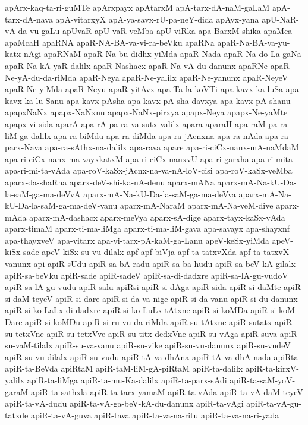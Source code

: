 {apArx-kaq-ta-ri-guMTe
apArxpayx
apAtarxM
apA-tarx-dA-naM-gaLaM
apA-tarx-dA-nava
apA-vitarxyX
apA-ya-savx-rU-pa-neY-dida
apAyx-yana
apU-NaR-vA-da-vu-gaLu
apUvaR
apU-vaR-veMba
apU-viRka
apa-BarxM-shika
apaMca
apaMcaH
apaRNA
apaR-NA-BA-va-vi-ra-beVku
apaRNa
apaR-Na-BA-va-yu-katx-nAgi
apaRNaM
apaR-Na-bu-didhx-yiMda
apaR-Nada
apaR-Na-do-La-gaNa
apaR-Na-kA-yaR-dalilx
apaR-Nashacx
apaR-Na-vA-du-danunx
apaRNe
apaR-Ne-yA-du-da-riMda
apaR-Neya
apaR-Ne-yalilx
apaR-Ne-yanunx
apaR-NeyeV
apaR-Ne-yiMda
apaR-Neyu
apaR-yitAvx
apa-Ta-la-koVTi
apa-kavx-ka-luSa
apa-kavx-ka-lu-Sanu
apa-kavx-pAsha
apa-kavx-pA-sha-davxya
apa-kavx-pA-shanu
apapxNaNx
apapx-NaNxnu
apapx-NaNx-pirxya
apapx-Neya
apapx-Ne-yaMte
apapx-vi-sida
aparA
apa-rA-pa-ra-va-sutx-valilx
apara
aparaH
apa-raM-pa-ra-liM-ga-dalilx
apa-ra-biMdu
apa-ra-diMda
apa-ra-jAcnxna
apa-ra-nAda
apa-ra-parx-Nava
apa-ra-sAthx-na-dalilx
apa-rava
apare
apa-ri-ciCx-nanx-mA-naMdaM
apa-ri-ciCx-nanx-ma-vayxkatxM
apa-ri-ciCx-nanxvU
apa-ri-garxha
apa-ri-mita
apa-ri-mi-ta-vAda
apa-roV-kaSx-jAcnx-na-va-nA-loV-cisi
apa-roV-kaSx-veMba
aparx-da-shaRna
aparx-deV-shi-ka-nA-denu
aparx-mANa
aparx-mA-Na-kU-Da-la-saM-ga-ma-deVvA
aparx-mA-Na-kU-Da-la-saM-ga-ma-deVva
aparx-mA-Na-kU-Da-la-saM-ga-ma-deV-vanu
aparx-mA-NaraM
aparx-mA-Na-veM-dive
aparx-mAda
aparx-mA-dashacx
aparx-meVya
aparx-sA-dige
aparx-tayx-kaSx-vAda
aparx-timaM
aparx-ti-ma-liMga
aparx-ti-ma-liM-gava
apa-savayx
apa-shayxnf
apa-thayxveV
apa-vitarx
apa-vi-tarx-pA-kaM-ga-Lanu
apeV-keSx-yiMda
apeV-kiSx-sade
apeV-kiSx-su-vu-dilalx
apf
apf-biVja
apf-ta-tatxvXda
apf-ta-tatxvX-vanunx
api
apiR-sUdu
apiR-sa-bA-radu
apiR-sa-ba-hudu
apiR-sa-beV-kA-gilalx
apiR-sa-beVku
apiR-sade
apiR-sadeV
apiR-sa-di-dadxre
apiR-sa-lA-gu-vudoV
apiR-sa-lA-gu-vudu
apiR-salu
apiRsi
apiR-si-dAga
apiR-sida
apiR-si-daMte
apiR-si-daM-teyeV
apiR-si-dare
apiR-si-da-va-nige
apiR-si-da-vanu
apiR-si-du-danunx
apiR-si-ko-LaLx-di-dadxre
apiR-si-ko-LuLx-tAtxne
apiR-si-koMDa
apiR-si-koM-Dare
apiR-si-koMDu
apiR-si-ru-vu-da-riMda
apiR-su-tAtxne
apiR-sutatx
apiR-su-tetxVne
apiR-su-tetxVve
apiR-su-titx-dedxVne
apiR-su-vAga
apiR-suva
apiR-su-vaM-tilalx
apiR-su-va-vanu
apiR-su-vike
apiR-su-vu-danunx
apiR-su-vudeV
apiR-su-vu-dilalx
apiR-su-vudu
apiR-tA-va-dhAna
apiR-tA-va-dhA-nada
apiRta
apiR-ta-BeVda
apiRtaM
apiR-taM-liM-gA-piRtaM
apiR-ta-dalilx
apiR-ta-kirxV-yalilx
apiR-ta-liMga
apiR-ta-mu-Ka-dalilx
apiR-ta-parx-sAdi
apiR-ta-saM-yoV-garaM
apiR-ta-sathxla
apiR-ta-tarx-yamaM
apiR-ta-vAda
apiR-ta-vA-daM-teyeV
apiR-ta-vA-dudu
apiR-ta-vA-ga-beV-kA-du-danunx
apiR-ta-vAgi
apiR-ta-vA-gu-tatxde
apiR-ta-vA-guva
apiR-tava
apiR-ta-va-na-ritu
apiR-ta-va-na-ri-yada
}
